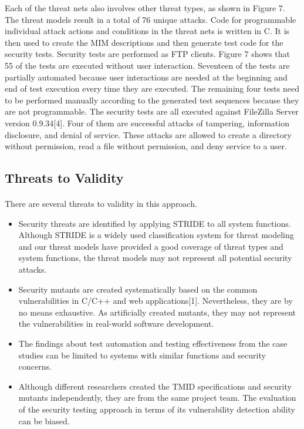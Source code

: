Each of the threat nets also involves other threat types, as
shown in Figure 7. The threat models result in a total of 76
unique attacks. Code for programmable individual attack
actions and conditions in the threat nets is written in C. It is
then used to create the MIM descriptions and then generate
test code for the security tests. Security tests are performed as
FTP clients. Figure 7 shows that 55 of the tests are executed
without user interaction. Seventeen of the tests are partially
automated because user interactions are needed at the
beginning and end of test execution every time they are
executed. The remaining four tests need to be performed manually according to the
generated test sequences because they are not programmable.
The security tests are all executed against FileZilla
Server version 0.9.34[4]. Four of them are successful attacks of
tampering, information disclosure, and denial of service.
These attacks are allowed to create a directory without
permission, read a file without permission, and deny service
to a user.
\newpage
\begin{center}
\section{Threats to Validity}
\end{center}
\paragraph*{}
There are several threats to validity in this approach.
\begin{itemize}
\item Security threats are identified by applying STRIDE to all
system functions. Although STRIDE is a widely used
classification system for threat modeling and our threat
models have provided a good coverage of threat types and
system functions, the threat models may not represent all
potential security attacks. 
\item Security mutants are created systematically based on the common vulnerabilities in C/C++ and web applications[1]. Nevertheless, they are by
no means exhaustive. As artificially created mutants, they
may not represent the vulnerabilities in real-world software
development. 
\item The findings about test automation
and testing effectiveness from the case studies can be
limited to systems with similar functions and security
concerns.
\item Although different researchers created the
TMID specifications and security mutants independently,
they are from the same project team. The evaluation of the
security testing approach in terms of its vulnerability
detection ability can be biased.
\end{itemize}
